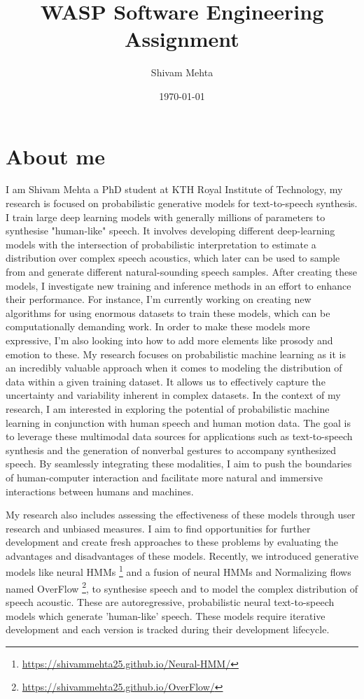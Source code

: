 \documentclass[11pt]{article}
\title{WASP Software Engineering Assignment}
\author{Shivam Mehta}
\date{\today}
\begin{document}
\maketitle


\section*{About me}

I am Shivam Mehta a PhD student at KTH Royal Institute of Technology, my research is focused on probabilistic generative models for text-to-speech synthesis. I train large deep learning models with generally millions of parameters to synthesise "human-like" speech. It involves developing different deep-learning models with the intersection of probabilistic interpretation to estimate a distribution over complex speech acoustics, which later can be used to sample from and generate different natural-sounding speech samples. After creating these models, I investigate new training and inference methods in an effort to enhance their performance. For instance, I'm currently working on creating new algorithms for using enormous datasets to train these models, which can be computationally demanding work.  In order to make these models more expressive, I'm also looking into how to add more elements like prosody and emotion to these.  
My research focuses on probabilistic machine learning as it is an incredibly valuable approach when it comes to modeling the distribution of data within a given training dataset. It allows us to effectively capture the uncertainty and variability inherent in complex datasets. In the context of my research, I am interested in exploring the potential of probabilistic machine learning in conjunction with human speech and human motion data. The goal is to leverage these multimodal data sources for applications such as text-to-speech synthesis and the generation of nonverbal gestures to accompany synthesized speech. By seamlessly integrating these modalities, I aim to push the boundaries of human-computer interaction and facilitate more natural and immersive interactions between humans and machines.

My research also includes assessing the effectiveness of these models through user research and unbiased measures. I aim to find opportunities for further development and create fresh approaches to these problems by evaluating the advantages and disadvantages of these models. Recently, we introduced generative models like neural HMMs \footnote{\url{https://shivammehta25.github.io/Neural-HMM/}} and a fusion of neural HMMs and Normalizing flows named OverFlow \footnote{\url{https://shivammehta25.github.io/OverFlow/}}, to synthesise speech and to model the complex distribution of speech acoustic. These are autoregressive, probabilistic neural text-to-speech models which generate 'human-like' speech. These models require iterative development and each version is tracked during their development lifecycle. 
\end{document}
